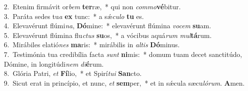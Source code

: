 {2.~}Etenim firmávit or\textit{bem} \textbf{ter}ræ,~* qui non \textit{com}\textit{mo}\textbf{vé}bitur.\\
{3.~}Paráta sedes tu\textit{a} \textbf{ex} tunc:~* a sǽ\textit{cu}\textit{lo} \textbf{tu} es.\\
{4.~}Elevavérunt flúmi\textit{na}, \textbf{Dó}mine:~* elevavérunt flúmina \textit{vo}\textit{cem} \textbf{su}am.\\
{5.~}Elevavérunt flúmina flu\textit{ctus} \textbf{su}os,~* a vócibus aquá\textit{rum} \textit{mul}\textbf{tá}rum.\\
{6.~}Mirábiles elatió\textit{nes} \textbf{ma}ris:~* mirábilis in \textit{al}\textit{tis} \textbf{Dó}minus.\\
{7.~}Testimónia tua credibília facta \textit{sunt} \textbf{ni}mis:~* domum tuam decet sanctitúdo, Dómine, in longitúdi\textit{nem} \textit{di}\textbf{é}rum.\\
{8.~}Glória Patri, \textit{et} \textbf{Fí}lio,~* et Spirí\textit{tu}\textit{i} \textbf{San}cto.\\
{9.~}Sicut erat in princípio, et nunc, \textit{et} \textbf{sem}per,~* et in sǽcula sæcu\textit{ló}\textit{rum}. \textbf{A}men.\\
